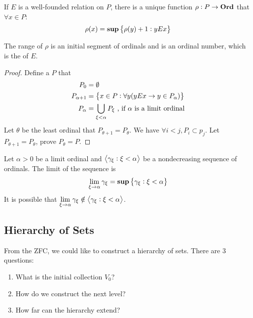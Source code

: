 \begin{theorem}
    If $E$ is a well-founded relation on $P$, there is a unique function $\rho : P \rightarrow \mathbf{Ord}$ that $\forall x \in P$:
    \begin{equation}
        \rho(x) = \mathbf{sup} \set{\rho (y) + 1: y E x}
    \end{equation}
    
    The range of $\rho$ is an initial segment of ordinals and is an ordinal number, which is the  of $E$.
\end{theorem}
\begin{proof}
    Define a $P$ that
    \begin{equation}
        \begin{aligned}
            P_0 &= \emptyset \\
            P_{\alpha + 1} &= \set{x \in P: \forall y (y E x \rightarrow y \in P_\alpha )} \\
            P_\alpha &= \bigcup_{\xi < \alpha} P_\xi \text{ , if } \alpha \text{ is a limit ordinal}
        \end{aligned}
    \end{equation}
    Let $\theta$ be the least ordinal that $P_{\theta +1} = P_\theta$. We have $\forall i<j, P_i \subset p_j$. Let $P_{\theta+1} =P_\theta $, prove $P_\theta = P$.
\end{proof}


\begin{definition}
    Let $\alpha>0$ be a limit ordinal and $\transfinitesequence{\gamma_\xi : \xi < \alpha}$ be a nondecreasing sequence of ordinals. The limit of the sequence is
    \begin{equation}
        \lim_{\xi \rightarrow \alpha} \gamma_\xi = \mathbf{sup} \set{\gamma_\xi : \xi < \alpha}
    \end{equation}
    It is possible that $\displaystyle \lim_{\xi \rightarrow \alpha} \gamma_\xi \notin \transfinitesequence{\gamma_\xi : \xi < \alpha}$.
\end{definition}




\subsection{Hierarchy of Sets}

From the ZFC, we could like to construct a hierarchy of sets. There are 3 questions:
\begin{enumerate}
    \item What is the initial collection $V_0$?
    \item How do we construct the next level?
    \item How far can the hierarchy extend?
\end{enumerate}

